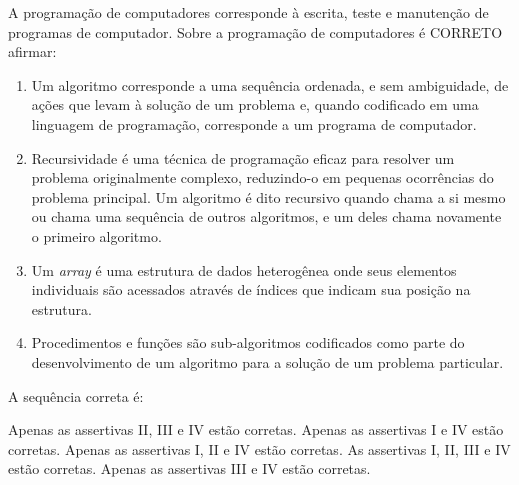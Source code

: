 
{%

\item \rtask \ponto{\pt} %
A programação de computadores corresponde à escrita, teste e manutenção de programas de computador. Sobre a programação de computadores é CORRETO afirmar:

\begin{enumerate}[label={\Roman*.},leftmargin=*]
    \item Um algoritmo corresponde a uma sequência ordenada, e sem ambiguidade, de ações que levam à solução de um problema e, quando codificado em uma linguagem de programação, corresponde a um programa de computador.
    
    \item Recursividade é uma técnica de programação eficaz para resolver um problema originalmente complexo, reduzindo-o em pequenas ocorrências do problema principal. Um algoritmo é dito recursivo quando chama a si mesmo ou chama uma sequência de outros algoritmos, e um deles chama novamente o primeiro algoritmo.
    
    \item Um \textit{array} é uma estrutura de dados heterogênea onde seus elementos individuais são acessados através de índices que indicam sua posição na estrutura.
    
    \item Procedimentos e funções são sub-algoritmos codificados como parte do desenvolvimento de um algoritmo para a solução de um problema particular.
\end{enumerate}

A sequência correta é:

\begin{answerlist}[label={\texttt{\Alph*}.},leftmargin=*]
    \ti Apenas as assertivas II, III e IV estão corretas.
    \ti Apenas as assertivas I e IV estão corretas.
    \di Apenas as assertivas I, II e IV estão corretas.
    \ti As assertivas I, II, III e IV estão corretas.
    \ti Apenas as assertivas III e IV estão corretas.
\end{answerlist}

}
